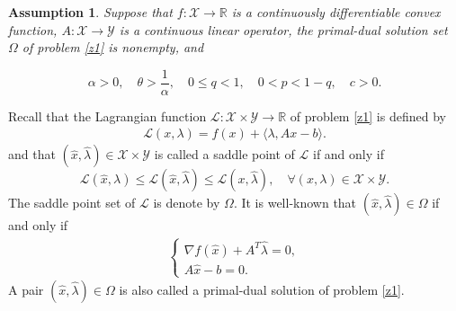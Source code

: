\documentclass[review]{elsarticle}
\newtheorem{assumption}{Assumption}[section]
\begin{document}
\begin{assumption}\label{AS-F}
	Suppose that  $f: \mathcal{X}\rightarrow \mathbb{R}$ is a continuously differentiable convex function, $A: \mathcal{X}\rightarrow \mathcal{Y}$ is a continuous linear operator,  the primal-dual solution set  $\Omega$ of problem \eqref{z1} is nonempty, and

 $$\alpha>0,\quad \theta>\frac{1}{\alpha},\quad 0\leq q<1,\quad 0<p<1-q,\quad c>0.$$
\end{assumption}

	Recall that  the Lagrangian function $\mathcal{L}: \mathcal{X}\times\mathcal{Y}\rightarrow\mathbb{R}$ of problem \eqref{z1} is defined by
	\begin{eqnarray*}
		\mathcal{L}(x,\lambda)=f(x)+\langle \lambda, Ax-b\rangle.
	\end{eqnarray*}
and that  $(\hat{x},\hat{\lambda})\in  \mathcal{X}\times\mathcal{Y}$ is called a saddle point of $\mathcal{L}$  if and only if 
	$$\mathcal{L}(\hat{x}, \lambda)\leq \mathcal{L}(\hat{x}, \hat{\lambda})\leq\mathcal{L}(x, \hat{\lambda}), \quad \forall (x,\lambda)\in\mathcal{X}\times\mathcal{Y}.$$
The  saddle point set of $\mathcal{L}$ is denote by $\Omega$. It is well-known that  $(\hat{x},\hat{\lambda})\in\Omega$ if and only if
	\begin{eqnarray}\label{zc1}
		\begin{cases}
			\nabla f(\hat{x})+A^T\hat{\lambda}=0,\\
			A\hat{x}-b=0.
		\end{cases}
	\end{eqnarray}
A pair  $(\hat{x},\hat{\lambda})\in\Omega$ is also called a primal-dual solution of  problem \eqref{z1}.  
	
\end{document}
